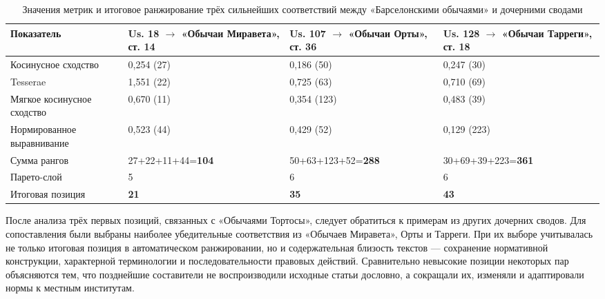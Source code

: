 \begin{center}
\small
\setlength{\tabcolsep}{2pt}
\begin{longtable}{|p{}|p{}|p{}|p{}|}
\caption{Значения метрик и итоговое ранжирование трёх сильнейших соответствий между «Барселонскими обычаями» и дочерними сводами}\label{tab:ch1-codes-ranking}\\
\hline
\textbf{Показатель} & \textbf{Us. 18 $\rightarrow$ «Обычаи Миравета», ст. 14} & \textbf{Us. 107 $\rightarrow$ «Обычаи Орты», ст. 36} & \textbf{Us. 128 $\rightarrow$ «Обычаи Тарреги», ст. 18} \\ \hline
Косинусное сходство & 0,254 (27) & 0,186 (50) & 0,247 (30) \\ \hline
Tesserae & 1,551 (22) & 0,725 (63) & 0,710 (69) \\ \hline
Мягкое косинусное сходство & 0,670 (11) & 0,354 (123) & 0,483 (39) \\ \hline
Нормированное выравнивание & 0,523 (44) & 0,429 (52) & 0,129 (223) \\ \hline
Сумма рангов & 27+22+11+44=\textbf{104} & 50+63+123+52=\textbf{288} & 30+69+39+223=\textbf{361} \\ \hline
Парето-слой & 5 & 6 & 6 \\ \hline
Итоговая позиция & \textbf{21} & \textbf{35} & \textbf{43} \\ \hline
\end{longtable}
\end{center}

После анализа трёх первых позиций, связанных с «Обычаями Тортосы», следует обратиться к примерам из других дочерних сводов. Для сопоставления были выбраны наиболее убедительные соответствия из «Обычаев Миравета», Орты и Тарреги. При их выборе учитывалась не только итоговая позиция в автоматическом ранжировании, но и содержательная близость текстов --- сохранение нормативной конструкции, характерной терминологии и последовательности правовых действий. Сравнительно невысокие позиции некоторых пар объясняются тем, что позднейшие составители не воспроизводили исходные статьи дословно, а сокращали их, изменяли и адаптировали нормы к местным институтам.

